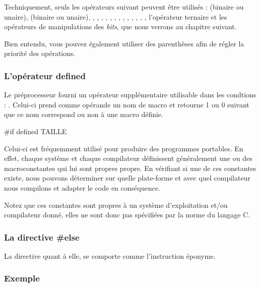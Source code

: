 Techniquement, seuls les opérateurs suivant peuvent être utilisés :
\mybox{+} (binaire ou unaire), \mybox{-} (binaire ou unaire),
\mybox{*}, \mybox{/}, \mybox{\%}, \mybox{==}, \mybox{!=},
\mybox{\textless{}=}, \mybox{\textless{}}, \mybox{\textgreater{}},
\mybox{\textgreater{}=}, \mybox{!}, \mybox{\&\&},
\mybox{\textbar{}\textbar{}}, \mybox{,}, l'opérateur ternaire et les
opérateurs de manipulations des \emph{bits}, que nous verrons au
chapitre suivant.

\begin{infobox}
  Bien entendu, vous pouvez également
utiliser des parenthèses afin de régler la priorité des opérations.
\end{infobox}


\subsubsection{L'opérateur defined}
\label{loperateur-defined}

Le préprocesseur fourni un opérateur supplémentaire utilisable dans les
condtions : . Celui-ci prend comme opérande un nom de
macro et retourne 1 ou 0 suivant que ce nom correspond ou non à une
macro définie.

\begin{C}
#if defined TAILLE
\end{C}

Celui-ci est fréquemment utilisé pour produire des programmes portables.
En effet, chaque système et chaque compilateur définissent généralement
une ou des macroconstantes qui lui sont propres propre. En vérifiant si
une de ces constantes existe, nous pouvons déterminer sur quelle
plate-forme et avec quel compilateur nous compilons et adapter le code
en conséquence.

\begin{attentionbox}
  Notez que ces constantes sont propres à
un système d'exploitation et/ou compilateur donné, elles ne sont donc
pas spécifiées par la norme du langage C.
\end{attentionbox}


\subsubsection{La directive \#else}
\label{la-directive-else}

La directive  quant à elle, se comporte comme
l'instruction éponyme.

\subsubsection{Exemple}
\label{exemple-14}

